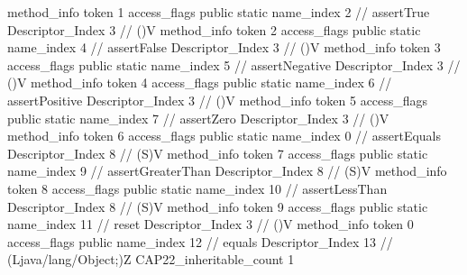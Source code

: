 {{{{{				}
				method_info {
					token	1
					access_flags	public static
					name_index	2		// assertTrue
					Descriptor_Index	3		// ()V
				}
				method_info {
					token	2
					access_flags	public static
					name_index	4		// assertFalse
					Descriptor_Index	3		// ()V
				}
				method_info {
					token	3
					access_flags	public static
					name_index	5		// assertNegative
					Descriptor_Index	3		// ()V
				}
				method_info {
					token	4
					access_flags	public static
					name_index	6		// assertPositive
					Descriptor_Index	3		// ()V
				}
				method_info {
					token	5
					access_flags	public static
					name_index	7		// assertZero
					Descriptor_Index	3		// ()V
				}
				method_info {
					token	6
					access_flags	public static
					name_index	0		// assertEquals
					Descriptor_Index	8		// (S)V
				}
				method_info {
					token	7
					access_flags	public static
					name_index	9		// assertGreaterThan
					Descriptor_Index	8		// (S)V
				}
				method_info {
					token	8
					access_flags	public static
					name_index	10		// assertLessThan
					Descriptor_Index	8		// (S)V
				}
				method_info {
					token	9
					access_flags	public static
					name_index	11		// reset
					Descriptor_Index	3		// ()V
				}
				method_info {
					token	0
					access_flags	public
					name_index	12		// equals
					Descriptor_Index	13		// (Ljava/lang/Object;)Z
				}
			}
			CAP22_inheritable_count	1
		}
	}
}
